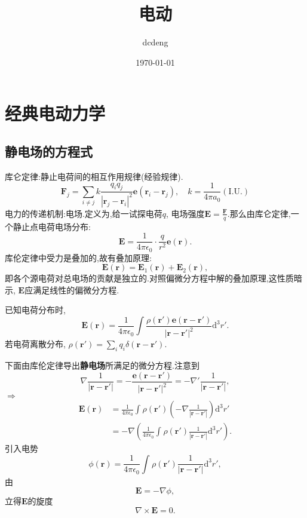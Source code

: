 \documentclass[oneside]{ctexbook}  %
\title{电动}
\date{\today}
\author{dcdeng}
\begin{document}
\maketitle
\chapter{经典电动力学}
\section{静电场的方程式}
库仑定律:静止电荷间的相互作用规律(经验规律).
\begin{equation}
    \mathbf{F }_{j} = \sum_{i\neq j}k\frac{q_{i }q_j}{|\mathbf{r}_j-\mathbf{r}_i|^{2}}\mathbf{e }(\mathbf{r}_i-\mathbf{r}_j), \quad k=\frac{1}{4\pi a_0}(\text{I.U.})
\end{equation}
电力的传递机制:电场.定义为,给一试探电荷$q$, 电场强度$\mathbf{E} = \frac{\mathbf{F }}{q}$.那么由库仑定律,一个静止点电荷电场分布:
\begin{equation}
    \mathbf{E} = \frac{1}{4\pi\epsilon_0}\cdot \frac{q}{r^{2}}\mathbf{e }(\mathbf{r}).
\end{equation}
库伦定律中受力是叠加的,故有叠加原理:
\begin{equation}
    \mathbf{E}(\mathbf{r})=\mathbf{E}_1(\mathbf{r})+\mathbf{E}_2(\mathbf{r}),
\end{equation}
即各个源电荷对总电场的贡献是独立的.对照偏微分方程中解的叠加原理,这性质暗示, $\mathbf{E}$应满足线性的偏微分方程.

已知电荷分布时,
\begin{equation}
    \mathbf{E}(\mathbf{r})=\frac{1}{4\pi\epsilon_0}\int\frac{\rho(\mathbf{r}')\mathbf{e }(\mathbf{r}-\mathbf{r}')}{|\mathbf{r}-\mathbf{r}'|^2}\mathrm{d^3}r'.
\end{equation}
若电荷离散分布, $\rho(\mathbf{r}') = \sum_{i}q_i\delta(\mathbf{r}-\mathbf{r}')$.

下面由库伦定律导出\textbf{静电场}所满足的微分方程.注意到
\begin{equation}
    \nabla\frac{1}{|\mathbf{r}-\mathbf{r}'|}=-\frac{\mathbf{e}(\mathbf{r}-\mathbf{r}')}{|\mathbf{r}-\mathbf{r}'|^2}=-\nabla'\frac{1}{|\mathbf{r}-\mathbf{r}'|},
\end{equation}
$\Rightarrow$
\begin{align}
    \mathbf{E}(\mathbf{r})
     & = \frac{1}{4\pi\epsilon_0}\int_{}^{} \rho(\mathbf{r}')\left( -\nabla\frac{1}{|\mathbf{r}-\mathbf{r}'|} \right) \mathrm{d}^3r' \\
     & =-\nabla\left(\frac{1}{4\pi\epsilon_0}\int_{}^{} \rho(\mathbf{r}') \frac{1}{|\mathbf{r}-\mathbf{r}'|} \mathrm{d}^3r' \right).
\end{align}
引入电势
\begin{equation}
    \phi(\mathbf{r}) = \frac{1}{4\pi\epsilon_0}\int_{}^{} \rho(\mathbf{r}') \frac{1}{|\mathbf{r}-\mathbf{r}'|} \mathrm{d}^3r',
\end{equation}
由
\begin{equation}
    \mathbf{E}=-\nabla\phi,
\end{equation}
立得$\mathbf{E}$的旋度
\begin{equation}
    \nabla\times \mathbf{E}=0.
\end{equation}
\end{document}
